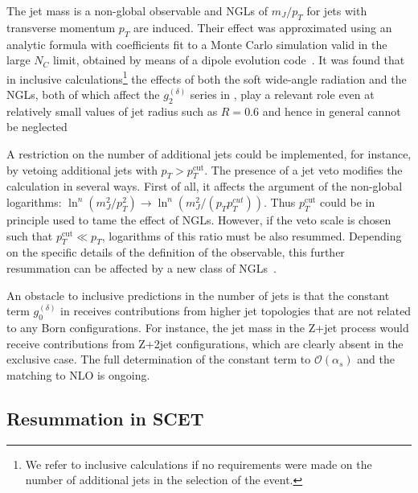 The jet mass is a non-global observable and NGLs of $m_J/p_T$ for jets 
with transverse momentum $p_T$ are induced. Their effect was 
approximated using an analytic formula with coefficients 
fit to a Monte Carlo simulation valid in the large $N_C$ limit, obtained 
by means of a dipole evolution code~\cite{Dasgupta:2001sh}. It was found 
that in inclusive calculations\footnote{We refer to inclusive calculations
if no requirements were made on the number of additional jets in the 
selection of the event.} 
the effects of both the soft wide-angle radiation and the NGLs, both 
of which affect the $g_2^{(\delta)}$ series in , play a relevant 
role even at relatively small values of jet radius such as $R=0.6$ and 
hence in general cannot be neglected

A restriction on the number of additional jets could be implemented, 
for instance, by vetoing additional jets with $p_T>p_T^\text{cut}$. 
The presence of a jet veto modifies the calculation in several ways. 
First of all, it affects the argument of the non-global logarithms: 
$\ln^n (m_J^2/p_T^2) \to \ln^n (m_J^2/(p_T p_T^{cut}))$. Thus $p_T^\text{cut}$ 
could be in principle used to tame the effect of NGLs. 
However, if the veto scale is chosen such that $p_T^\text{cut}\ll p_T$, 
logarithms of this ratio must be also resummed. Depending on the specific 
details of the definition of the observable, this further resummation can 
be affected by a new class of NGLs~\cite{Banfi:2010pa,KhelifaKerfa:2011zu}.


An obstacle to inclusive predictions in the number of jets is that the constant 
term $g_0^{(\delta)}$ in  receives contributions from higher jet 
topologies that are not related to any Born configurations. For instance, 
the jet mass in the Z+jet process would receive contributions from Z+2jet 
configurations, which are clearly absent in the exclusive case. The full 
determination of the constant term to $\mathcal{O}(\alpha_s)$ and the 
matching to NLO is ongoing.


\subsection{Resummation in SCET}
\label{subsec:SCET}

